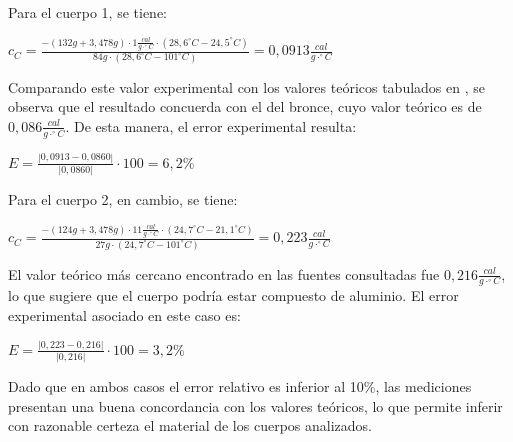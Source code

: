 \documentclass[12pt, a4paper]{article}
\begin{document}
Para el cuerpo 1, se tiene:

\begin{center}
    $ c_C = \frac{ - (132g + 3,478g) \cdot 1 \frac{cal}{g \cdot ^\circ C} \cdot (28,6^\circ C - 24,5^\circ C) }{ 84g \cdot (28,6^\circ C - 101^\circ C)} = 0,0913 \frac{cal}{g \cdot ^\circ C} $
\end{center}

Comparando este valor experimental con los valores teóricos tabulados en \cite{educamix_capacidad, fisicanet_calor}, se observa que el resultado concuerda con el del bronce, cuyo valor teórico es de $ 0,086 \frac{cal}{g \cdot ^\circ C} $. De esta manera, el error experimental resulta:

\begin{center}
    $ E =  \frac{|0,0913-0,0860|}{|0,0860|}\cdot 100 = 6,2 \% $
\end{center}

Para el cuerpo 2, en cambio, se tiene:

\begin{center}
    $ c_C = \frac{ - (124g + 3,478g) \cdot 11 \frac{cal}{g \cdot ^\circ C} \cdot (24,7^\circ C - 21,1^\circ C) }{ 27g \cdot (24,7^\circ C - 101^\circ C)} = 0,223 \frac{cal}{g \cdot ^\circ C} $
\end{center}

El valor teórico más cercano encontrado en las fuentes consultadas \cite{educamix_capacidad,fisicanet_calor} fue $ 0,216 \frac{cal}{g \cdot ^\circ C} $, lo que sugiere que el cuerpo podría estar compuesto de aluminio. El error experimental asociado en este caso es:
\begin{center}
    $ E =  \frac{|0,223-0,216|}{|0,216|}\cdot 100 = 3,2 \% $
\end{center}

Dado que en ambos casos el error relativo es inferior al 10\%, las mediciones presentan una buena concordancia con los valores teóricos, lo que permite inferir con razonable certeza el material de los cuerpos analizados.


\newpage
 
\end{document}
